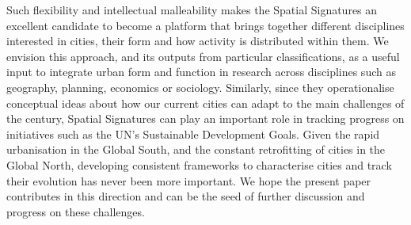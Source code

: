 Such flexibility and intellectual malleability makes the Spatial Signatures
an excellent candidate to become a platform that brings together different
disciplines interested in cities, their form and how activity is distributed
within them. We envision this approach, and its outputs from particular
classifications, as a useful input to integrate urban form and function in
research across disciplines such as geography, planning, economics or
sociology.
Similarly, since they operationalise conceptual ideas about how our current
cities can adapt to the main challenges of the century, Spatial Signatures
can play an important role in tracking progress on initiatives such as the
UN's Sustainable Development Goals.
%
Given the rapid urbanisation in the Global South, and the constant
retrofitting of cities in the Global North, developing consistent frameworks
to characterise cities and track their evolution has never been more
important.
%
We hope the present paper contributes in this direction and can be the seed
of further discussion and progress on these challenges.



